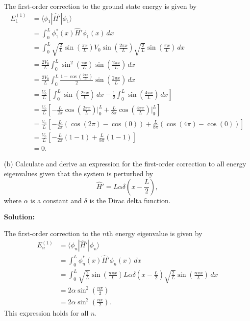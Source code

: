 \documentclass{article}
\begin{document}
The first-order correction to the ground state energy is given by
\begin{align*}
E_1^{(1)} &= \langle \phi_1 | \hat{H}' | \phi_1 \rangle \\
&= \int_0^L \phi_1^*(x) \hat{H}' \phi_1(x) \, dx \\
&= \int_0^L \sqrt{\frac{2}{L}} \sin\left(\frac{\pi x}{L}\right) V_0 \sin\left(\frac{2\pi x}{L}\right) \sqrt{\frac{2}{L}} \sin\left(\frac{\pi x}{L}\right) \, dx \\
&= \frac{2V_0}{L} \int_0^L \sin^2\left(\frac{\pi x}{L}\right) \sin\left(\frac{2\pi x}{L}\right) \, dx \\
&= \frac{2V_0}{L} \int_0^L \frac{1 - \cos\left(\frac{2\pi x}{L}\right)}{2} \sin\left(\frac{2\pi x}{L}\right) \, dx \\
&= \frac{V_0}{L} \left[ \int_0^L \sin\left(\frac{2\pi x}{L}\right) \, dx - \frac{1}{2} \int_0^L \sin\left(\frac{4\pi x}{L}\right) \, dx \right] \\
&= \frac{V_0}{L} \left[ -\frac{L}{2\pi} \cos\left(\frac{2\pi x}{L}\right) \bigg|_0^L + \frac{L}{8\pi} \cos\left(\frac{4\pi x}{L}\right) \bigg|_0^L \right] \\
&= \frac{V_0}{L} \left[ -\frac{L}{2\pi} (\cos(2\pi) - \cos(0)) + \frac{L}{8\pi} (\cos(4\pi) - \cos(0)) \right] \\
&= \frac{V_0}{L} \left[ -\frac{L}{2\pi} (1 - 1) + \frac{L}{8\pi} (1 - 1) \right] \\
&= \boxed{0}.
\end{align*}

(b) Calculate and derive an expression for the first-order correction to all energy eigenvalues given that the system is perturbed by
\[
\hat{H}' = L \alpha \delta\left(x - \frac{L}{2}\right),
\]
where $\alpha$ is a constant and $\delta$ is the Dirac delta function.

\textbf{Solution:}

The first-order correction to the $n$th energy eigenvalue is given by
\begin{align*}
E_n^{(1)} &= \langle \phi_n | \hat{H}' | \phi_n \rangle \\
&= \int_0^L \phi_n^*(x) \hat{H}' \phi_n(x) \, dx \\
&= \int_0^L \sqrt{\frac{2}{L}} \sin\left(\frac{n \pi x}{L}\right) L \alpha \delta\left(x - \frac{L}{2}\right) \sqrt{\frac{2}{L}} \sin\left(\frac{n \pi x}{L}\right) \, dx \\
&= 2 \alpha \sin^2\left(\frac{n \pi}{2}\right) \\
&= \boxed{2 \alpha \sin^2\left(\frac{n \pi}{2}\right)}.
\end{align*}
This expression holds for all $n$.
\end{document}
